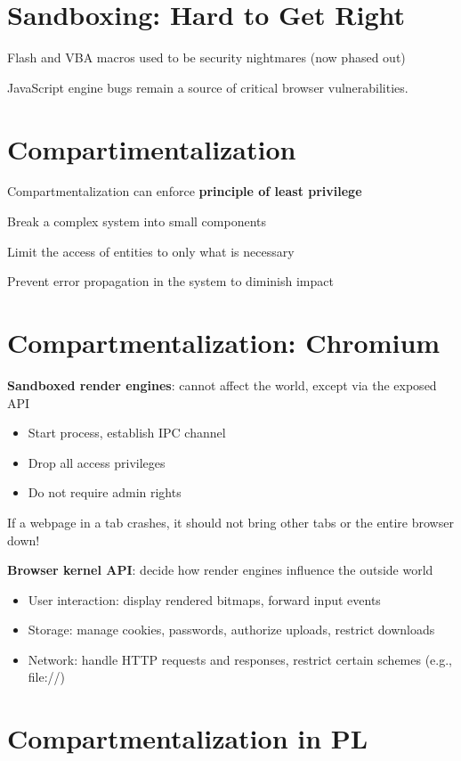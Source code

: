 \documentclass[11pt]{article}
\begin{document}
\section*{Sandboxing: Hard to Get Right}

Flash and VBA macros used to be security nightmares (now phased out)

JavaScript engine bugs remain a source of critical browser vulnerabilities.

\section*{Compartimentalization}

Compartmentalization can enforce \textbf{principle of least privilege}

Break a complex system into small components

Limit the access of entities to only what is necessary

Prevent error propagation in the system to diminish impact

\section*{Compartmentalization: Chromium}

\textbf{Sandboxed render engines}: cannot affect the world, except via the exposed API
\begin{itemize}
	\item Start process, establish IPC channel
	\item Drop all access privileges
	\item Do not require admin rights
\end{itemize}

If a webpage in a tab crashes, it should not bring other tabs or the entire browser down!

\textbf{Browser kernel API}: decide how render engines influence the outside world

\begin{itemize}
	\item User interaction: display rendered bitmaps, forward input events
	\item Storage: manage cookies, passwords, authorize uploads, restrict downloads
	\item Network: handle HTTP requests and responses, restrict certain schemes (e.g., file://) 
\end{itemize}

\section*{Compartmentalization in PL}
\end{document}
